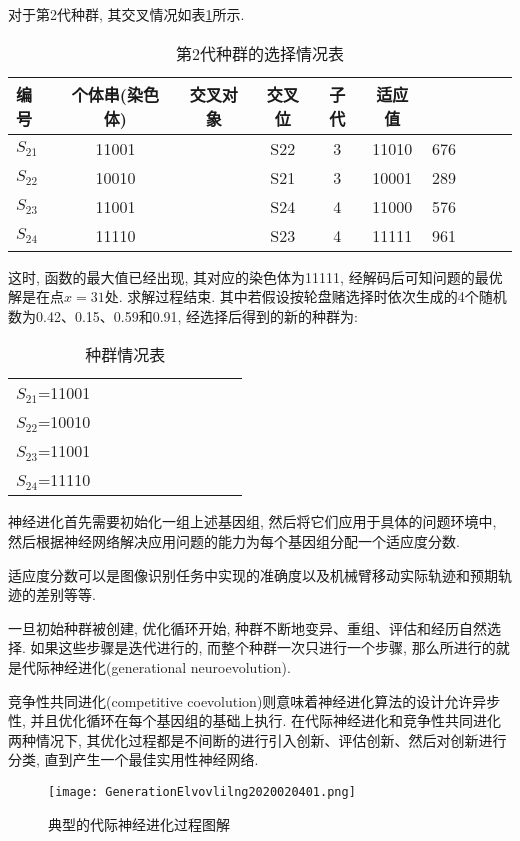 对于第2代种群, 其交叉情况如表\ref{AI_table2019112810}所示.
\begin{table} [H]
\caption{第2代种群的选择情况表}
\vspace{-0.4cm}
\begin{center}
\begin{tabular} {lccccccccc}
  \hline
编号&	个体串(染色体)&	交叉对象&	交叉位&子代&适应值\\
  \hline
$S_{21}$&	11001&	    &S22	&3	&11010&	676\\
$S_{22}$&	10010&	    &S21    &3	&10001&	289\\
$S_{23}$&	11001&	    &S24	&4	&11000&	576\\
$S_{24}$&	11110&	   & S23	&4	&11111&	961\\
\hline
\end{tabular}
\end{center}
\label{AI_table2019112810}
\vspace{-0.4cm}
\end{table}
这时, 函数的最大值已经出现, 其对应的染色体为11111, 经解码后可知问题的最优解是在点$x=31$处. 求解过程结束.
其中若假设按轮盘赌选择时依次生成的4个随机数为0.42、0.15、0.59和0.91, 经选择后得到的新的种群为:
\begin{table} [H]
\caption{种群情况表}
\vspace{-0.4cm}
\begin{center}
\begin{tabular} {lccccccccc}
\hline
$S_{21}$=11001\\
$S_{22}$=10010\\
$S_{23}$=11001\\
$S_{24}$=11110\\
\hline
\end{tabular}
\end{center}
\vspace{-0.4cm}
\end{table}
\begin{remark}
    神经进化首先需要初始化一组上述基因组, 然后将它们应用于具体的问题环境中, 然后根据神经网络解决应用问题的能力为每个基因组分配一个适应度分数.
\begin{newexam}
    适应度分数可以是图像识别任务中实现的准确度以及机械臂移动实际轨迹和预期轨迹的差别等等.
\end{newexam}

一旦初始种群被创建, 优化循环开始, 种群不断地变异、重组、评估和经历自然选择.
如果这些步骤是迭代进行的, 而整个种群一次只进行一个步骤, 那么所进行的就是代际神经进化(generational neuroevolution).

竞争性共同进化(competitive coevolution)则意味着神经进化算法的设计允许异步性, 并且优化循环在每个基因组的基础上执行.
在代际神经进化和竞争性共同进化两种情况下, 其优化过程都是不间断的进行引入创新、评估创新、然后对创新进行分类, 直到产生一个最佳实用性神经网络.
\begin{figure}[H]
\centering
\texttt{[image: GenerationElvovlilng2020020401.png]}
\caption{典型的代际神经进化过程图解}
\label{GenerationElvovlilng2020020401}
\vspace{-0.4cm}
\end{figure}
\end{remark}
